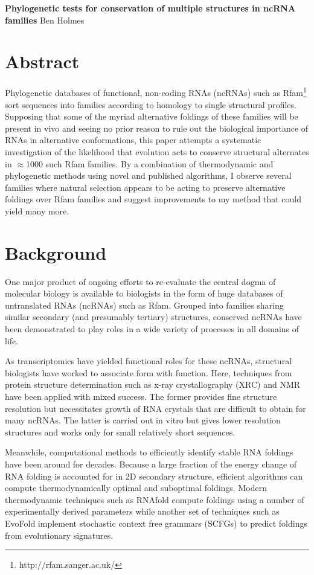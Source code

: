 \documentclass[12pt,a4paper]{article}
\begin{document}
 
\setlength{\parindent}{5ex} 
\setlength{\parskip}{0ex}
\renewcommand{\thefootnote}{\alph{footnote}}
\noindent\textbf{Phylogenetic tests for conservation of multiple structures in ncRNA families} 
\noindent Ben Holmes
\section{Abstract}
Phylogenetic databases of functional, non-coding RNAs (ncRNAs) such as Rfam\footnote{http://rfam.sanger.ac.uk/} sort sequences into families according to homology to single structural profiles. Supposing that some of the myriad alternative foldings of these families will be present in vivo and seeing no prior reason to rule out the biological importance of RNAs in alternative conformations, this paper attempts a systematic investigation of the likelihood that evolution acts to conserve structural alternates in $\approx$1000 such Rfam families. By a combination of thermodynamic and phylogenetic methods using novel and published algorithms, I observe several families where natural selection appears to be acting to preserve alternative foldings over Rfam families and suggest improvements to my method that could yield many more.


\section{Background}
One major product of ongoing efforts to re-evaluate the central dogma of molecular biology is available to biologists in the form of huge databases of untranslated RNAs (ncRNAs) such as Rfam. Grouped into families sharing similar secondary (and presumably tertiary) structures, conserved ncRNAs have been demonstrated to play roles in a wide variety of processes in all domains of life. 

As transcriptomics have yielded functional roles for these ncRNAs, structural biologists have worked to associate form with function. Here, techniques from protein structure determination such as x-ray crystallography (XRC) and NMR have been applied with mixed success. The former provides fine structure resolution but necessitates growth of RNA crystals that are difficult to obtain for many ncRNAs. The latter is carried out in vitro but gives lower resolution structures and works only for small relatively short sequences.

Meanwhile, computational methods to efficiently identify stable RNA foldings have been around for decades. Because a large fraction of the energy change of RNA folding is accounted for in 2D secondary structure, efficient algorithms can compute thermodynamically optimal and suboptimal \cite{RefWorks:17} foldings. Modern thermodynamic techniques such as RNAfold \cite{RefWorks:24} compute foldings using a number of experimentally derived parameters while another set of techniques such as EvoFold \cite{RefWorks:21} implement stochastic context free grammars (SCFGs) to predict foldings from evolutionary signatures.
\end{document}
